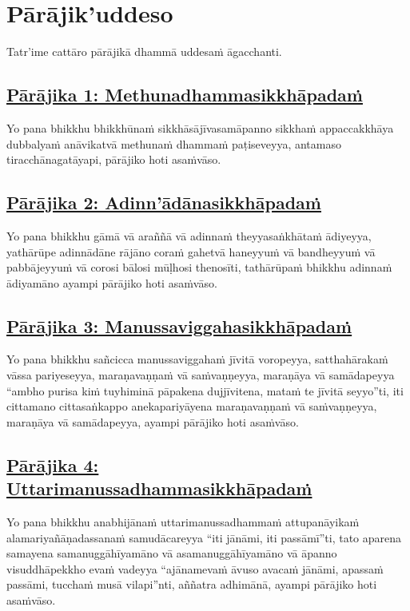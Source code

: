 \section{Pārājik'uddeso}
\label{par}

\begin{intro}
  Tatr'ime cattāro pārājikā dhammā uddesaṁ āgacchanti.
\end{intro}

\setsubsecheadstyle{\subsubsectionFmt}
\subsection*{\hyperref[disq1]{Pārājika 1: Methunadhammasikkhāpadaṁ}}
\label{par1}
Yo pana bhikkhu bhikkhūnaṁ sikkhāsājīvasamāpanno sikkhaṁ appaccakkhāya dubbalyaṁ anāvikatvā methunaṁ dhammaṁ paṭiseveyya, antamaso tiracchānagatāyapi, pārājiko hoti asaṁvāso.

\subsection*{\hyperref[disq2]{Pārājika 2: Adinn'ādānasikkhāpadaṁ}}
\label{par2}
Yo pana bhikkhu gāmā vā araññā vā adinnaṁ theyyasaṅkhātaṁ ādiyeyya, yathārūpe adinnādāne rājāno coraṁ gahetvā haneyyuṁ vā bandheyyuṁ vā pabbājeyyuṁ vā corosi bālosi mūḷhosi thenosīti, tathārūpaṁ bhikkhu adinnaṁ ādiyamāno ayampi pārājiko hoti asaṁvāso.

\subsection*{\hyperref[disq3]{Pārājika 3: Manussaviggahasikkhāpadaṁ}}
\label{par3}
Yo pana bhikkhu sañcicca manussaviggahaṁ jīvitā voropeyya, satthahārakaṁ vāssa pariyeseyya, maraṇavaṇṇaṁ vā saṁvaṇṇeyya, maraṇāya vā samādapeyya “ambho purisa kiṁ tuyhiminā pāpakena dujjīvitena, mataṁ te jīvitā seyyo”ti, iti cittamano cittasaṅkappo anekapariyāyena maraṇavaṇṇaṁ vā saṁvaṇṇeyya, maraṇāya vā samādapeyya, ayampi pārājiko hoti asaṁvāso.

\subsection*{\hyperref[disq4]{Pārājika 4: Uttarimanussadhammasikkhāpadaṁ}}
\label{par4}
Yo pana bhikkhu anabhijānaṁ uttarimanussadhammaṁ attupanāyikaṁ alamariyañāṇadassanaṁ samudācareyya “iti jānāmi, iti passāmī”ti, tato aparena samayena samanuggāhīyamāno vā asamanuggāhīyamāno vā āpanno visuddhāpekkho evaṁ vadeyya “ajānamevaṁ āvuso avacaṁ jānāmi, apassaṁ passāmi, tucchaṁ musā vilapi”nti, aññatra adhimānā, ayampi pārājiko hoti asaṁvāso.

